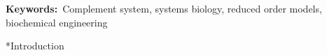 \documentclass[12pt]{article}
\makeatletter
\renewcommand\section{\@startsection
	{subsection}{2}{0mm}
	{-0.2in}
	{0.05\baselineskip}
	{\normalfont\large\bfseries}}
\makeatother
\begin{document}


\vspace{0.1in}
{\noindent \textbf{Keywords:}~Complement system, systems biology, reduced order models, biochemical engineering}

\pagebreak

\setcounter{page}{1}

\linenumbers


\section*{Introduction}
\end{document}
